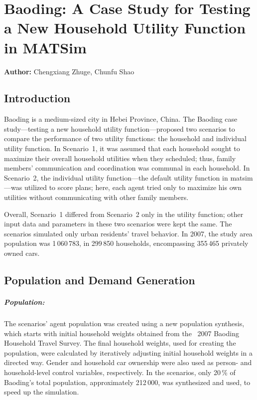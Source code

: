 \chapter{Baoding: A Case Study for Testing a New Household Utility Function in MATSim}
\label{ch:baoding}
\hfill \textbf{Author:} Chengxiang Zhuge, Chunfu Shao



\section{Introduction}
Baoding is a medium-sized city in Hebei Province, China. 
The Baoding case study---testing a new household utility function---proposed two scenarios to compare the performance of two utility functions: the household and individual utility function. 
In Scenario~1, it was assumed that each household sought to maximize their overall household utilities when they scheduled; thus, family members' communication and coordination was communal in each household. In Scenario~2, the individual utility function---the default utility function in \gls{matsim}---was utilized to score plans; here, each agent tried only  to maximize his own utilities without communicating with other family members. 

Overall, Scenario~1 differed from Scenario~2 only in the utility function; other input data and parameters in these two scenarios were kept the same. 
The scenarios simulated only urban residents' travel behavior. 
In 2007, the study area population was 1\,060\,783, in 299\,850 households, encompassing 355\,465 privately owned cars.  

\section{Population and Demand Generation}
\paragraph{Population:} The scenarios' agent population was created using a new population synthesis, which  starts with initial household weights obtained from the ~2007 Baoding  Household Travel Survey. 
The final household weights, used for creating the population, were calculated by iteratively adjusting initial household weights in a directed way. 
Gender and household car ownership were also used as person- and household-level control variables, respectively. 
In the scenarios, only 20\,\% of Baoding's total population, approximately 212\,000, was synthesized and used, to speed up the simulation. 

